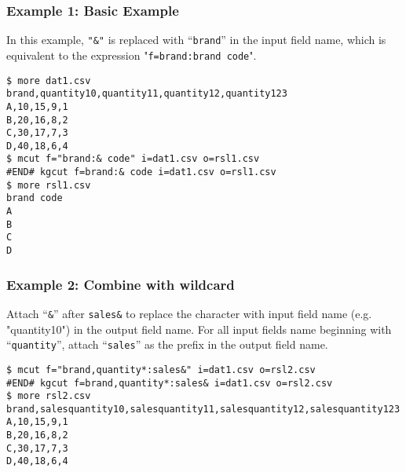 \subsubsection*{Example 1: Basic Example}

In this example, \verb|"&"| is replaced with “\verb|brand|” in the input field name, which is equivalent to the expression "\verb|f=brand:brand code|".


\begin{Verbatim}[baselinestretch=0.7,frame=single]
$ more dat1.csv
brand,quantity10,quantity11,quantity12,quantity123
A,10,15,9,1
B,20,16,8,2
C,30,17,7,3
D,40,18,6,4
$ mcut f="brand:& code" i=dat1.csv o=rsl1.csv
#END# kgcut f=brand:& code i=dat1.csv o=rsl1.csv
$ more rsl1.csv
brand code
A
B
C
D
\end{Verbatim}
\subsubsection*{Example 2: Combine with wildcard}

Attach “\verb|&|” after \verb|sales&| to replace the character with input field name (e.g. "quantity10") in the output field name.  For all input fields name beginning with “\verb|quantity|”, attach “\verb|sales|” as the prefix in the output field name. 


\begin{Verbatim}[baselinestretch=0.7,frame=single]
$ mcut f="brand,quantity*:sales&" i=dat1.csv o=rsl2.csv
#END# kgcut f=brand,quantity*:sales& i=dat1.csv o=rsl2.csv
$ more rsl2.csv
brand,salesquantity10,salesquantity11,salesquantity12,salesquantity123
A,10,15,9,1
B,20,16,8,2
C,30,17,7,3
D,40,18,6,4
\end{Verbatim}
